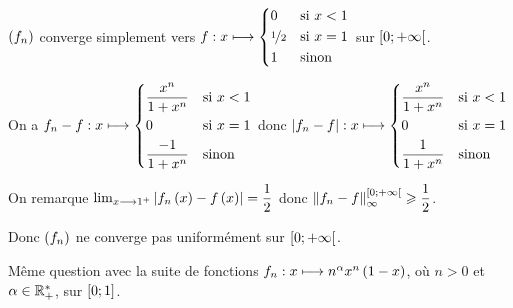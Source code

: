 \begin{corr}
\(\paren{f_n}\) converge simplement vers \(f:x\mapsto\begin{dcases}
0 &\text{si }x<1 \\
\nicefrac{1}{2} &\text{si }x=1 \\
1 &\text{sinon}
\end{dcases}\) sur \(\intervie{0}{\pinf}\).

On a \(f_n-f:x\mapsto\begin{dcases}
\dfrac{x^n}{1+x^n} &\text{si }x<1 \\
0 &\text{si }x=1 \\
\dfrac{-1}{1+x^n} &\text{sinon}
\end{dcases}\) donc \(\abs{f_n-f}:x\mapsto\begin{dcases}
\dfrac{x^n}{1+x^n} &\text{si }x<1 \\
0 &\text{si }x=1 \\
\dfrac{1}{1+x^n} &\text{sinon}
\end{dcases}\)

On remarque \(\lim_{x\to1^+}\abs{f_n\paren{x}-f\paren{x}}=\dfrac{1}{2}\) donc \(\norme{f_n-f}_\infty^{\intervie{0}{\pinf}}\geq\dfrac{1}{2}\).

Donc \(\paren{f_n}\) ne converge pas uniformément sur \(\intervie{0}{\pinf}\).
\end{corr}

\begin{exo}
Même question avec la suite de fonctions \(f_n:x\mapsto n^\alpha x^n\paren{1-x}\), où \(n>0\) et \(\alpha\in\Rps\), sur \(\intervii{0}{1}\).
\end{exo}

